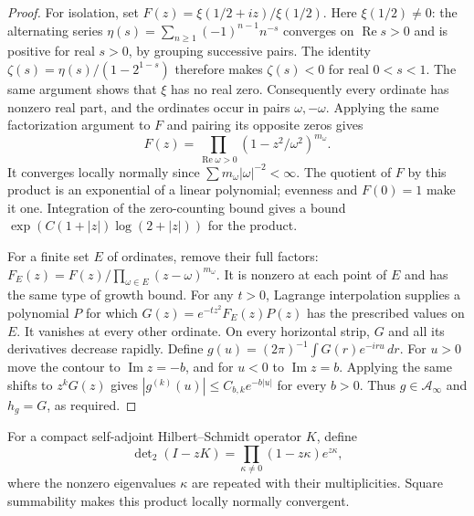 \begin{proof}
For isolation, set $F(z)=\xi(1/2+iz)/\xi(1/2)$.
Here $\xi(1/2)\ne0$: the alternating series
$\eta(s)=\sum_{n\geq1}(-1)^{n-1}n^{-s}$ converges on
$\operatorname{Re}s>0$ and is positive for real $s>0$, by grouping
successive pairs. The identity
$\zeta(s)=\eta(s)/(1-2^{1-s})$ therefore makes $\zeta(s)<0$
for real $0<s<1$.
The same argument shows that $\xi$ has no real zero.
Consequently every ordinate has nonzero real part, and the ordinates
occur in pairs $\omega,-\omega$.
Applying the same factorization argument to $F$ and pairing its
opposite zeros gives
\begin{equation}\label{nwc:eq:paired-product}
 F(z)=\prod_{\operatorname{Re}\omega>0}
                         (1-z^2/\omega^2)^{m_\omega}.
\end{equation}
It converges locally normally since
$\sum m_\omega|\omega|^{-2}<\infty$.
The quotient of $F$ by this product is an exponential of a linear
polynomial; evenness and $F(0)=1$ make it one.
Integration of the zero-counting bound gives a bound
$\exp(C(1+|z|)\log(2+|z|))$ for the product.

For a finite set $E$ of ordinates, remove their full factors:
$F_E(z)=F(z)/\prod_{\omega\in E}(z-\omega)^{m_\omega}$.
It is nonzero at each point of $E$ and has the same type of growth
bound. For any $t>0$, Lagrange interpolation supplies a polynomial
$P$ for which $G(z)=e^{-tz^2}F_E(z)P(z)$ has the prescribed values
on $E$. It vanishes at every other ordinate.
On every horizontal strip, $G$ and all its derivatives decrease
rapidly. Define $g(u)=(2\pi)^{-1}\int G(r)e^{-iru}\,dr$.
For $u>0$ move the contour to $\operatorname{Im}z=-b$, and for
$u<0$ to $\operatorname{Im}z=b$.
Applying the same shifts to $z^kG(z)$ gives
$|g^{(k)}(u)|\leq C_{b,k}e^{-b|u|}$ for every $b>0$.
Thus $g\in\mathcal A_\infty$ and $h_g=G$, as required.
\end{proof}

For a compact self-adjoint Hilbert--Schmidt operator $K$, define
\[
 \det\nolimits_2(I-zK)
   =\prod_{\kappa\ne0}(1-z\kappa)e^{z\kappa},
\]
where the nonzero eigenvalues $\kappa$ are repeated with their
multiplicities. Square summability makes this product locally normally
convergent.

